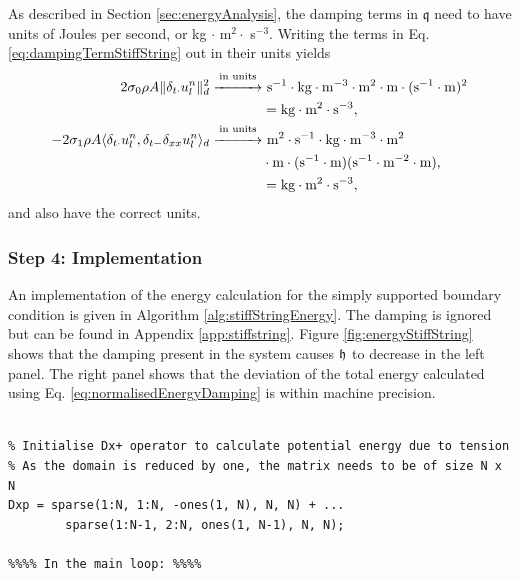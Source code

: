 {As described in Section \ref{sec:energyAnalysis}, the damping terms in $\mathfrak{q}$ need to have units of Joules per second, or kg $\cdot$ m$^2 \cdot$ s$^{-3}$. Writing the terms in Eq. \eqref{eq:dampingTermStiffString} out in their units yields
\begin{align*}
    2\sz \rho A \lVert\dtd\uln\rVert_d^2\overset{\text{in units}}{\xrightarrow{\hspace*{1cm}}}&\ \text{s}^{-1}\cdot\text{kg}\cdot\text{m}^{-3}\cdot\text{m}^2\cdot \text{m}\cdot(\text{s}^{-1}\cdot\text{m})^2 \\
    &= \text{kg} \cdot \text{m}^2 \cdot \text{s}^{-3},\\
    - 2 \so \rho A \langle \dtd \uln, \dtm \dxx \uln \rangle_d \overset{\text{in units}}{\xrightarrow{\hspace*{1cm}}}&\  \text{m}^2\cdot\text{s}^{-1}\cdot\text{kg}\cdot\text{m}^{-3}\cdot\text{m}^2\\
    &\cdot\text{m}\cdot(\text{s}^{-1}\cdot\text{m})(\text{s}^{-1}\cdot\text{m}^{-2}\cdot \text{m}),\\
    &= \text{kg} \cdot \text{m}^2 \cdot \text{s}^{-3},
\end{align*}
and also have the correct units.
\subsubsection{Step 4: Implementation}
An implementation of the energy calculation for the simply supported boundary condition is given in Algorithm \ref{alg:stiffStringEnergy}. The damping is ignored but can be found in Appendix \ref{app:stiffstring}.  Figure \ref{fig:energyStiffString} shows that the damping present in the system causes $\mathfrak{h}$ to decrease in the left panel. The right panel shows that the deviation of the total energy calculated using Eq. \eqref{eq:normalisedEnergyDamping} is within machine precision.

\setlstMAT
\begin{lstlisting}[caption=Calculating $\h$ for the simply supported boundary condition., label=alg:stiffStringEnergy]
%%%% Before the main loop: %%%%

% Initialise Dx+ operator to calculate potential energy due to tension
% As the domain is reduced by one, the matrix needs to be of size N x N
Dxp = sparse(1:N, 1:N, -ones(1, N), N, N) + ...
        sparse(1:N-1, 2:N, ones(1, N-1), N, N);

%%%% In the main loop: %%%%


\end{lstlisting}}
